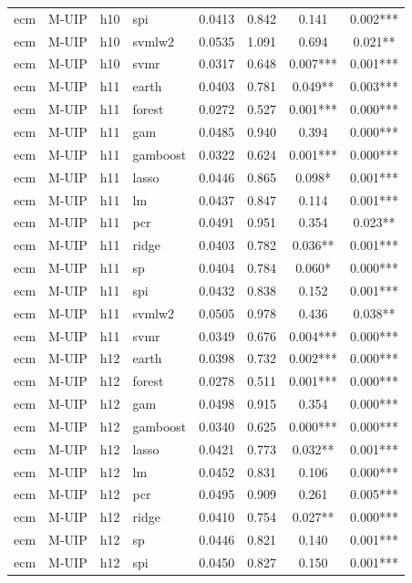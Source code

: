 \begin{ThreePartTable}
\begin{longtable}[t]{llclcccc}
ecm & M-UIP & h10 & spi & 0.0413 & 0.842 & 0.141 & 0.002***\\
ecm & M-UIP & h10 & svmlw2 & 0.0535 & 1.091 & 0.694 & 0.021**\\
ecm & M-UIP & h10 & svmr & 0.0317 & 0.648 & 0.007*** & 0.001***\\
\addlinespace
ecm & M-UIP & h11 & earth & 0.0403 & 0.781 & 0.049** & 0.003***\\
ecm & M-UIP & h11 & forest & 0.0272 & 0.527 & 0.001*** & 0.000***\\
ecm & M-UIP & h11 & gam & 0.0485 & 0.940 & 0.394 & 0.000***\\
ecm & M-UIP & h11 & gamboost & 0.0322 & 0.624 & 0.001*** & 0.000***\\
ecm & M-UIP & h11 & lasso & 0.0446 & 0.865 & 0.098* & 0.001***\\
ecm & M-UIP & h11 & lm & 0.0437 & 0.847 & 0.114 & 0.001***\\
ecm & M-UIP & h11 & pcr & 0.0491 & 0.951 & 0.354 & 0.023**\\
ecm & M-UIP & h11 & ridge & 0.0403 & 0.782 & 0.036** & 0.001***\\
ecm & M-UIP & h11 & sp & 0.0404 & 0.784 & 0.060* & 0.000***\\
ecm & M-UIP & h11 & spi & 0.0432 & 0.838 & 0.152 & 0.001***\\
ecm & M-UIP & h11 & svmlw2 & 0.0505 & 0.978 & 0.436 & 0.038**\\
ecm & M-UIP & h11 & svmr & 0.0349 & 0.676 & 0.004*** & 0.000***\\
\addlinespace
ecm & M-UIP & h12 & earth & 0.0398 & 0.732 & 0.002*** & 0.000***\\
ecm & M-UIP & h12 & forest & 0.0278 & 0.511 & 0.001*** & 0.000***\\
ecm & M-UIP & h12 & gam & 0.0498 & 0.915 & 0.354 & 0.000***\\
ecm & M-UIP & h12 & gamboost & 0.0340 & 0.625 & 0.000*** & 0.000***\\
ecm & M-UIP & h12 & lasso & 0.0421 & 0.773 & 0.032** & 0.001***\\
ecm & M-UIP & h12 & lm & 0.0452 & 0.831 & 0.106 & 0.000***\\
ecm & M-UIP & h12 & pcr & 0.0495 & 0.909 & 0.261 & 0.005***\\
ecm & M-UIP & h12 & ridge & 0.0410 & 0.754 & 0.027** & 0.000***\\
ecm & M-UIP & h12 & sp & 0.0446 & 0.821 & 0.140 & 0.001***\\
ecm & M-UIP & h12 & spi & 0.0450 & 0.827 & 0.150 & 0.001***\\

\end{longtable}
\end{ThreePartTable}
